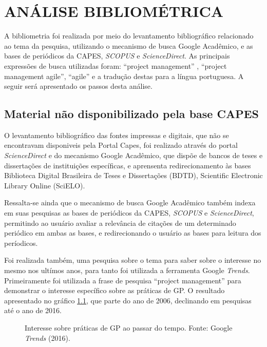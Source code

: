 \apendice
\chapter{ANÁLISE BIBLIOMÉTRICA}

A bibliometria foi realizada por meio do levantamento bibliográfico relacionado ao tema da pesquisa, utilizando o mecanismo de busca Google Acadêmico, e as bases de periódicos da CAPES, \textit{SCOPUS} e \textit{ScienceDirect}. As principais expressões de busca utilizadas foram: ``project management'' , ``project management agile'', ``agile'' e a tradução destas para a língua portuguesa. A seguir será apresentado os passos desta análise.

\section{Material não disponibilizado pela base CAPES}

O levantamento bibliográfico das fontes impressas e digitais, que não se encontravam disponiveis pela Portal Capes, foi realizado através do portal \textit{ScienceDirect} e do mecanismo Google Acadêmico, que dispõe de bancos de teses e dissertações de instituições específicas, e aprensenta redirecionamento às bases Biblioteca Digital Brasileira de Teses e Dissertações (BDTD), Scientific Electronic Library Online (SciELO).

Ressalta-se ainda que o mecanismo de busca Google Acadêmico também indexa em suas pesquisas as bases de periódicos da CAPES, \textit{SCOPUS} e \textit{ScienceDirect}, permitindo ao usuário avaliar a relevância de citações de um determinado periódico em ambas as bases, e redirecionando o usuário as bases para leitura dos períodicos.

Foi realizada também, uma pesquisa sobre o tema para saber sobre o interesse no mesmo nos ultímos anos, para tanto foi utilizada a ferramenta Google \textit{Trends}. Primeiramente foi utilizada a frase de pesquisa ``project management'' para demonstrar o interesse específico sobre as práticas de GP. O resultado apresentado no gráfico \ref{trends1}, que parte do ano de 2006, declinando em pesquisas até o ano de 2016.


\begin{figure}[!ht]
  \centering
  \caption{Interesse sobre práticas de GP ao passar do tempo. Fonte: Google \textit{Trends} (2016).}
  \label{trends1}
\end{figure}


